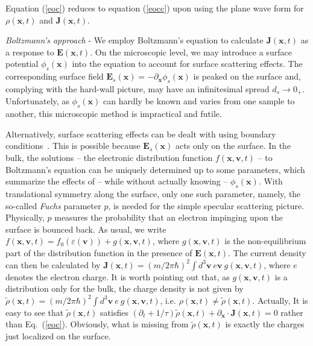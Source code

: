 \documentclass[aps,reprint]{revtex4-1}
\begin{document}
Equation (\ref{eoc}) reduces to equation (\ref{eocc}) upon using the plane wave form for $\rho(\mathbf{x},t)$ and $\mathbf{J}(\mathbf{x},t)$.     

\textit{Boltzmann's approach} - We employ Boltzmann's equation to calculate $\mathbf{J}(\mathbf{x},t)$ as a response to $\mathbf{E}(\mathbf{x},t)$. On the microscopic level, we may introduce a surface potential $\phi_s(\mathbf{x})$ into the equation to account for surface scattering effects. The corresponding surface field $\mathbf{E}_s(\mathbf{x}) = -\partial_{\mathbf{x}}\phi_s(\mathbf{x})$ is peaked on the surface and, complying with the hard-wall picture, may have an infinitesimal spread $d_s\rightarrow 0_+$. Unfortunately, as $\phi_s(\mathbf{x})$ can hardly be known and varies from one sample to another, this microscopic method is impractical and futile. 

Alternatively, surface scattering effects can be dealt with using boundary conditions~\cite{ziman1960,abrikosov,reuter1948,kaganov1997}. This is possible because $\mathbf{E}_s(\mathbf{x})$ acts only on the surface. In the bulk, the solutions -- the electronic distribution function $f(\mathbf{x},\mathbf{v},t)$ -- to Boltzmann's equation can be uniquely determined up to some parameters, which summarize the effects of -- while without actually knowing -- $\phi_s(\mathbf{x})$. With translational symmetry along the surface, only one such parameter, namely, the so-called \textit{Fuchs} parameter $p$, is needed for the simple specular scattering picture. Physically, $p$ measures the probability that an electron impinging upon the surface is bounced back. As usual, we write $f(\mathbf{x},\mathbf{v},t) = f_0(\varepsilon(\mathbf{v}))+g(\mathbf{x},\mathbf{v},t)$, where $g(\mathbf{x},\mathbf{v},t)$ is the non-equilibrium part of the distribution function in the presence of $\mathbf{E}(\mathbf{x},t)$. The current density can then be calculated by $\mathbf{J}(\mathbf{x},t) = (m/2\pi\hbar)^2\int d^3\mathbf{v}~e\mathbf{v}~g(\mathbf{x},\mathbf{v},t)$, where $e$ denotes the electron charge. It is worth pointing out that, as $g(\mathbf{x},\mathbf{v},t)$ is a distribution only for the bulk, the charge density is not given by $\tilde{\rho}(\mathbf{x},t) = (m/2\pi\hbar)^2\int d^3\mathbf{v}~e~g(\mathbf{x},\mathbf{v},t)$, i.e. $\rho(\mathbf{x},t)\neq\tilde{\rho}(\mathbf{x},t)$. Actually, It is easy to see that $\tilde{\rho}(\mathbf{x},t)$ satisfies $(\partial_t+1/\tau)\tilde{\rho}(\mathbf{x},t)+\partial_{\mathbf{x}}\cdot\mathbf{J}(\mathbf{x},t)=0$ rather than Eq.~(\ref{eoc}). Obviously, what is missing from $\tilde{\rho}(\mathbf{x},t)$ is exactly the charges just localized on the surface. 
\end{document}
